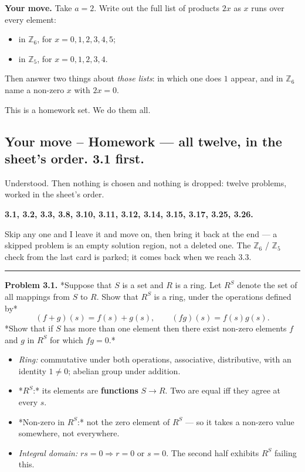 \documentclass[11pt]{article}
\newenvironment{studentturn}[1]{%
  \par\medskip\needspace{4\baselineskip}%
  \noindent{\small\bfseries\sffamily #1}\par\nopagebreak\smallskip
  \begingroup\setlength{\leftskip}{1.2em}%
}{\endgroup\par\medskip}
\begin{document}
\textbf{Your move.} Take $a = 2$. Write out the full list of products $2x$ as $x$ runs over every element:

\begin{itemize}
  \item in $\mathbb{Z}_6$, for $x = 0,1,2,3,4,5$;
  \item in $\mathbb{Z}_5$, for $x = 0,1,2,3,4$.
\end{itemize}

Then answer two things about \emph{those lists}: in which one does $1$ appear, and in $\mathbb{Z}_6$ name a non-zero $x$ with $2x = 0$.


\begin{studentturn}{You said, 2026-09-02 10:35:38}
This is a homework set. We do them all.
\end{studentturn}

\subsection*{Your move -- Homework --- all twelve, in the sheet's order. 3.1 first.}
Understood. Then nothing is chosen and nothing is dropped: twelve problems, worked in the sheet's order.

\textbf{3.1, 3.2, 3.3, 3.8, 3.10, 3.11, 3.12, 3.14, 3.15, 3.17, 3.25, 3.26.}

Skip any one and I leave it and move on, then bring it back at the end --- a skipped problem is an empty solution region, not a deleted one. The $\mathbb{Z}_6$ / $\mathbb{Z}_5$ check from the last card is parked; it comes back when we reach 3.3.

\medskip\hrule\medskip

\textbf{Problem 3.1.} *Suppose that $S$ is a set and $R$ is a ring. Let $R^S$ denote the set of all mappings from $S$ to $R$. Show that $R^S$ is a ring, under the operations defined by*
$$(f+g)(s) = f(s) + g(s), \qquad (fg)(s) = f(s)g(s).$$
*Show that if $S$ has more than one element then there exist non-zero elements $f$ and $g$ in $R^S$ for which $fg = 0$.*

\begin{itemize}
  \item \emph{Ring:} commutative under both operations, associative, distributive, with an identity $1 \neq 0$; abelian group under addition.
  \item *$R^S$:* its elements are \textbf{functions} $S \to R$. Two are equal iff they agree at every $s$.
  \item *Non-zero in $R^S$:* not the zero element of $R^S$ --- so it takes a non-zero value somewhere, not everywhere.
  \item \emph{Integral domain:} $rs = 0 \Rightarrow r = 0$ or $s = 0$. The second half exhibits $R^S$ failing this.
\end{itemize}
\end{document}
